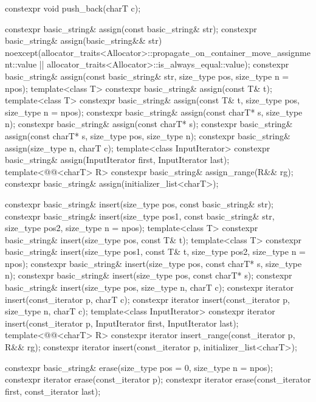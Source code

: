\begin{codeblock}
{{    constexpr void push_back(charT c);

    constexpr basic_string& assign(const basic_string& str);
    constexpr basic_string& assign(basic_string&& str)
      noexcept(allocator_traits<Allocator>::propagate_on_container_move_assignment::value ||
               allocator_traits<Allocator>::is_always_equal::value);
    constexpr basic_string& assign(const basic_string& str, size_type pos, size_type n = npos);
    template<class T>
      constexpr basic_string& assign(const T& t);
    template<class T>
      constexpr basic_string& assign(const T& t, size_type pos, size_type n = npos);
    constexpr basic_string& assign(const charT* s, size_type n);
    constexpr basic_string& assign(const charT* s);
    constexpr basic_string& assign(const charT* s, size_type pos, size_type n);
    constexpr basic_string& assign(size_type n, charT c);
    template<class InputIterator>
      constexpr basic_string& assign(InputIterator first, InputIterator last);
    template<@@<charT> R>
      constexpr basic_string& assign_range(R&& rg);
    constexpr basic_string& assign(initializer_list<charT>);

    constexpr basic_string& insert(size_type pos, const basic_string& str);
    constexpr basic_string& insert(size_type pos1, const basic_string& str,
                                   size_type pos2, size_type n = npos);
    template<class T>
      constexpr basic_string& insert(size_type pos, const T& t);
    template<class T>
      constexpr basic_string& insert(size_type pos1, const T& t,
                                     size_type pos2, size_type n = npos);
    constexpr basic_string& insert(size_type pos, const charT* s, size_type n);
    constexpr basic_string& insert(size_type pos, const charT* s);
    constexpr basic_string& insert(size_type pos, size_type n, charT c);
    constexpr iterator insert(const_iterator p, charT c);
    constexpr iterator insert(const_iterator p, size_type n, charT c);
    template<class InputIterator>
      constexpr iterator insert(const_iterator p, InputIterator first, InputIterator last);
    template<@@<charT> R>
      constexpr iterator insert_range(const_iterator p, R&& rg);
    constexpr iterator insert(const_iterator p, initializer_list<charT>);

    constexpr basic_string& erase(size_type pos = 0, size_type n = npos);
    constexpr iterator erase(const_iterator p);
    constexpr iterator erase(const_iterator first, const_iterator last);

}}
\end{codeblock}
